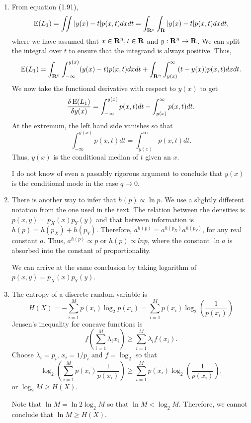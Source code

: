 \begin{enumerate}
\item From equation (1.91),
\[
\operatorname{E}(L_1) = \iint |y(x) - t|p(x, t)dxdt = \int_{\mathbf{R}^n}\int_{\mathbf{R}}|y(x) - t|p(x,t)dxdt,
\]
where we have assumed that $x \in \mathbf{R}^n, t \in \mathbf{R}$ and $y: \mathbf{R}^n \to \mathbf{R}$. We can split
the integral over $t$ to ensure that the integrand is always positive. Thus,
\[
\operatorname{E}(L_1) = \int_{\mathbf{R}^n}\int_{-\infty}^{y(x)} (y(x) - t)p(x, t)dxdt + \int_{\mathbf{R}^n}\int_{y(x)}^{\infty}(t - y(x))p(x, t)dxdt.
\]
We now take the functional derivative with respect to $y(x)$ to get
\[
\frac{\delta\operatorname{E}(L_1)}{\delta y(x)} = \int_{-\infty}^{y(x)}p(x,t)dt - \int_{y(x)}^{\infty}p(x, t)dt.
\]
At the extremum, the left hand side vanishes so that
\[
\int_{-\infty}^{y(x)}p(x,t)dt = \int_{y(x)}^{\infty}p(x, t)dt.
\]
Thus, $y(x)$ is the conditional median of $t$ given an $x$.

I do not know of even a passably rigorous argument to conclude that $y(x)$ is the conditional 
mode in the case $q \to 0$.

\item There is another way to infer that $h(p) \propto \ln p$. We use a slightly different notation
from the one used in the text. The relation between the densities is $p(x, y) = p_X(x)p_Y(y)$ and
that between information is $h(p) = h(p_X) + h(p_Y)$. Therefore, $a^{h(p)} = a^{h(p_X)}a^{h(p_Y)}$,
for any real constant $a$. Thus, $a^{h(p)} \propto p$ or $h(p) \propto ln p$, where the constant 
$\ln a$ is absorbed into the constant of proportionality.

We can arrive at the same conclusion by taking logarithm of $p(x,y) = p_X(x)p_Y(y)$.

\item The entropy of a discrete random variable is
\[
H(X) = -\sum_{i=1}^Mp(x_i)\log_2 p(x_i) = \sum_{i=1}^M p(x_i)\log_2\left(\frac{1}{p(x_i)}\right)
\]
Jensen's inequality for concave functions is
\[
f\left(\sum_{i=1}^M \lambda_i x_i\right) \ge \sum_{i=1}^M \lambda_i f(x_i).
\]
Choose $\lambda_i = p_i$, $x_i = 1/p_i$ and $f = \log_2$ so that
\[
\log_2\left(\sum_{i=1}^M p(x_i)\frac{1}{p(x_i)}\right) \ge \sum_{i=1}^M p(x_i)\log_2\left(\frac{1}{p(x_i)}\right).
\]
or $\log_2 M \ge H(X)$. 

Note that $\ln M = \ln 2 \log_2 M$ so that $\ln M < \log_2 M$. Therefore, we cannot conclude
that $\ln M \ge H(X)$.


\end{enumerate}
